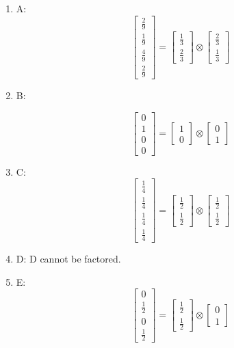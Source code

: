 \documentclass[11pt]{article}
\begin{document}
\begin{solution}
	\begin{enumerate}
		\item A: \[
			\begin{bmatrix}
				\frac{2}{9}\\[0.1em]
				\frac{1}{9}\\[0.1em]
				\frac{4}{9}\\[0.1em]
				\frac{2}{9}
			\end{bmatrix} = \begin{bmatrix}
				\frac{1}{3} \\[0.1em] 
				\frac{2}{3}
			\end{bmatrix} \otimes 
			\begin{bmatrix}
				\frac{2}{3} \\[0.1em]
				\frac{1}{3}
			\end{bmatrix}
		\]
		\item B:
		
		\[
			\begin{bmatrix}
				0 \\ 1 \\ 0 \\ 0
			\end{bmatrix} = \begin{bmatrix}
				1 \\ 0
			\end{bmatrix} \otimes 
			\begin{bmatrix}
				0 \\ 1
			\end{bmatrix}
		\]
		
		\item C: \[
			\begin{bmatrix}
				\frac{1}{4}\\[0.1em]
				\frac{1}{4}\\[0.1em]
				\frac{1}{4}\\[0.1em]
				\frac{1}{4}
			\end{bmatrix} = \begin{bmatrix}
				\frac{1}{2} \\[0.1em] 
				\frac{1}{2}
			\end{bmatrix} \otimes 
			\begin{bmatrix}
				\frac{1}{2} \\[0.1em]
				\frac{1}{2}
			\end{bmatrix}
		\]
		\item D: D cannot be factored. 
		\item E: \[
			\begin{bmatrix}
				0\\[0.1em]
				\frac{1}{2}\\[0.1em]
				0\\[0.1em]
				\frac{1}{2}
			\end{bmatrix} = \begin{bmatrix}
				\frac{1}{2} \\[0.1em] 
				\frac{1}{2}
			\end{bmatrix} \otimes 
			\begin{bmatrix}
				0 \\
				1
			\end{bmatrix}
		\]
	\end{enumerate}
	

\end{solution}
\end{document}
